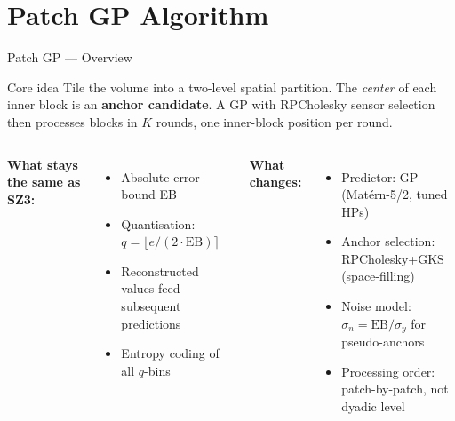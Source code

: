 \documentclass[10pt]{beamer}
\begin{document}
\section{Patch GP Algorithm}
\begin{frame}{Patch GP --- Overview}
  \begin{block}{Core idea}
    Tile the volume into a two-level spatial partition.
    The \emph{center} of each inner block is an \textbf{anchor candidate}.
    A GP with RPCholesky sensor selection then processes blocks
    in $K$ rounds, one inner-block position per round.
  \end{block}
  \vspace{4pt}
  \begin{columns}
    \textbf{What stays the same as SZ3:}
    \begin{itemize}
      \item Absolute error bound EB
      \item Quantisation: $q=\lfloor e/(2\cdot\mathrm{EB})\rceil$
      \item Reconstructed values feed subsequent predictions
      \item Entropy coding of all $q$-bins
    \end{itemize}
    \textbf{What changes:}
    \begin{itemize}
      \item Predictor: GP (Matérn-5/2, tuned HPs)
      \item Anchor selection: RPCholesky+GKS (space-filling)
      \item Noise model: $\sigma_n=\mathrm{EB}/\sigma_y$ for pseudo-anchors
      \item Processing order: patch-by-patch, not dyadic level
    \end{itemize}
  \end{columns}
\end{frame}
\end{document}
